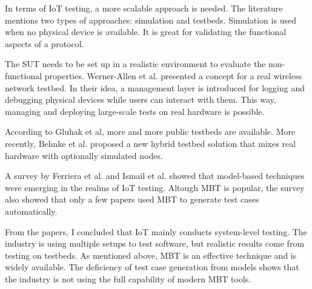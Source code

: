 In terms of IoT testing, a more scalable approach is needed. The literature mentions two types of approaches: simulation and testbeds. Simulation is used when no physical device is available. It is great for validating the functional aspects of a protocol.

The SUT needs to be set up in a realistic environment to evaluate the non-functional properties. Werner-Allen et al. presented a concept for a real wireless network testbed. In their idea, a management layer is introduced for logging and debugging physical devices while users can interact with them. This way, managing and deploying large-scale tests on real hardware is possible\cite{1440979}.

According to Gluhak et al, more and more public testbeds are available\cite{6069710}. More recently, Behnke et al.\cite{10.1145/3368235.3368832} proposed a new hybrid testbed solution that mixes real hardware with optionally simulated nodes.

A survey by Ferriera et al. and Ismail et al.\cite{10.1145/3624032.3624049, 10.3991/ijim.v14i09.13431} showed that model-based techniques were emerging in the realms of IoT testing. Altough MBT is popular, the survey also showed that only a few papers used MBT to generate test cases automatically.

From the papers, I concluded that IoT mainly conducts system-level testing. The industry is using multiple setups to test software, but realistic results come from testing on testbeds. As mentioned above, MBT is an effective technique and is widely available. The deficiency of test case generation from models shows that the industry is not using the full capability of modern MBT tools.